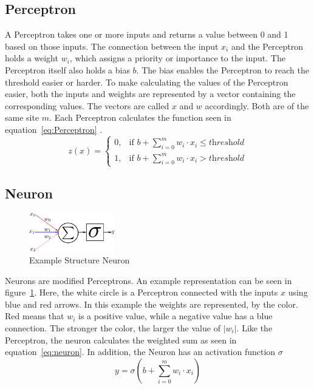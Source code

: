 \documentclass{article}
\begin{document}
\subsection{Perceptron}
A Perceptron takes one or more inputs and returns a value between 0 and 1 based on those inputs. The connection between the input $x_i$ and the Perceptron holds a weight $w_i$, which assigns a priority or importance to the input. The Perceptron itself also holds a bias $b$. The bias enables the Perceptron to reach the threshold easier or harder.
To make calculating the values of the Perceptron easier, both the inputs and weights are represented by a vector containing the corresponding values. The vectors are called $x$ and $w$ accordingly. Both are of the same site $m$. Each Perceptron calculates the function seen in equation~\ref{eq:Perceptron} \autocite[Chapter \textit{Using neural nets to recognize handwritten digits - Perceptrons}]{Nielsen:NNDP}.
\begin{equation}
    z(x)=
    \begin{cases}
        0,  & \text{if } b+\sum_{i=0}^m w_i \cdot x_i \leq \textit{threshold}\\
        1,  & \text{if } b+\sum_{i=0}^m w_i \cdot x_i > \textit{threshold}
    \end{cases}
    \label{eq:Perceptron}
\end{equation}

\subsection{Neuron}
\begin{figure}
    \includegraphics[width=0.33\textwidth]{images/Perceptron.png}
    \centering
  \caption{Example Structure Neuron}
  \label{fig:neuron}
\end{figure}
Neurons are modified Perceptrons. An example representation can be seen in figure~\ref{fig:neuron}. Here, the white circle is a Perceptron connected with the inputs $x$ using blue and red arrows. In this example the weights are represented, by the color. Red means that $w_i$ is a positive value, while a negative value has a blue connection. The stronger the color, the larger the value of $|w_i|$. 
Like the Perceptron, the neuron calculates the weighted sum as seen in equation~\ref{eq:neuron}.  In addition, the Neuron has an activation function $\sigma$
\begin{equation}
    y = \sigma\left(b+\sum_{i=0}^m w_i \cdot x_i\right)
    \label{eq:neuron}
\end{equation}
\end{document}
